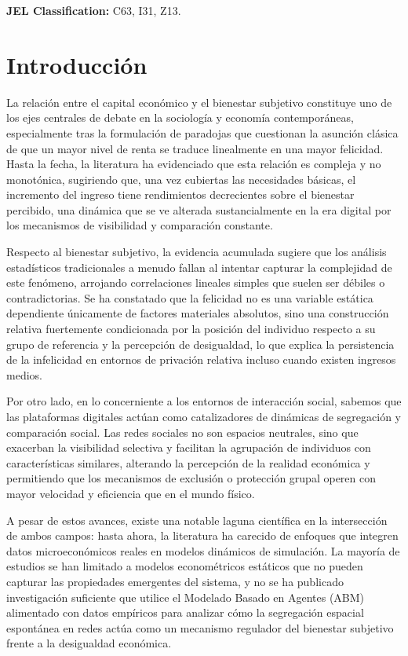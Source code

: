 \documentclass[a4paper,12pt]{article}
\begin{document}
\noindent \textbf{JEL Classification:} 
C63, I31, Z13.

\newpage

\section{Introducción}

La relación entre el capital económico y el bienestar subjetivo constituye uno de los ejes centrales de debate en la sociología y economía contemporáneas, especialmente tras la formulación de paradojas que cuestionan la asunción clásica de que un mayor nivel de renta se traduce linealmente en una mayor felicidad. Hasta la fecha, la literatura ha evidenciado que esta relación es compleja y no monotónica, sugiriendo que, una vez cubiertas las necesidades básicas, el incremento del ingreso tiene rendimientos decrecientes sobre el bienestar percibido, una dinámica que se ve alterada sustancialmente en la era digital por los mecanismos de visibilidad y comparación constante.

Respecto al bienestar subjetivo, la evidencia acumulada sugiere que los análisis estadísticos tradicionales a menudo fallan al intentar capturar la complejidad de este fenómeno, arrojando correlaciones lineales simples que suelen ser débiles o contradictorias. Se ha constatado que la felicidad no es una variable estática dependiente únicamente de factores materiales absolutos, sino una construcción relativa fuertemente condicionada por la posición del individuo respecto a su grupo de referencia y la percepción de desigualdad, lo que explica la persistencia de la infelicidad en entornos de privación relativa incluso cuando existen ingresos medios.

Por otro lado, en lo concerniente a los entornos de interacción social, sabemos que las plataformas digitales actúan como catalizadores de dinámicas de segregación y comparación social. Las redes sociales no son espacios neutrales, sino que exacerban la visibilidad selectiva y facilitan la agrupación de individuos con características similares, alterando la percepción de la realidad económica y permitiendo que los mecanismos de exclusión o protección grupal operen con mayor velocidad y eficiencia que en el mundo físico.

A pesar de estos avances, existe una notable laguna científica en la intersección de ambos campos: hasta ahora, la literatura ha carecido de enfoques que integren datos microeconómicos reales en modelos dinámicos de simulación. La mayoría de estudios se han limitado a modelos econométricos estáticos que no pueden capturar las propiedades emergentes del sistema, y no se ha publicado investigación suficiente que utilice el Modelado Basado en Agentes (ABM) alimentado con datos empíricos para analizar cómo la segregación espacial espontánea en redes actúa como un mecanismo regulador del bienestar subjetivo frente a la desigualdad económica.
\end{document}
